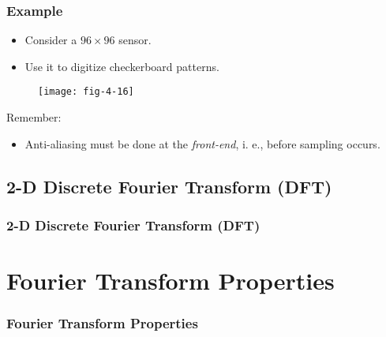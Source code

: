 
\begin{frame}
\frametitle{Example}
\begin{itemize}
\item Consider a $96\times 96$ sensor.
\item Use it to digitize checkerboard patterns.
\end{itemize}
\begin{figure}
\centering
\texttt{[image: fig-4-16]}
\end{figure}
\end{frame}


\begin{frame}
Remember:
\begin{itemize}
\item Anti-aliasing must be done at the \textit{front-end}, i. e., before sampling occurs.
\end{itemize}
\end{frame}


\subsection{2-D Discrete Fourier Transform (DFT)}


\begin{frame}
\frametitle{2-D Discrete Fourier Transform (DFT)}
\end{frame}


\section{Fourier Transform Properties}


\begin{frame}
\frametitle{Fourier Transform Properties}
\end{frame}

